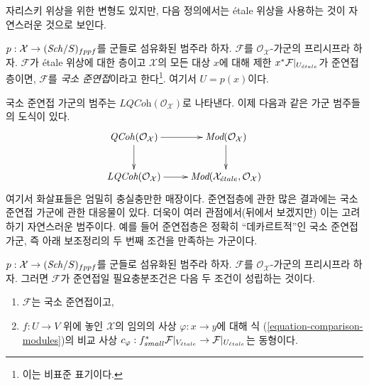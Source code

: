 \noindent
자리스키 위상을 위한 변형도 있지만, 다음 정의에서는
\'etale 위상을 사용하는 것이 자연스러운 것으로 보인다.

\begin{definition}
\label{definition-locally-quasi-coherent}
$p : \mathcal{X} \to (\mathit{Sch}/S)_{fppf}$를 군들로 섬유화된 범주라 하자.
$\mathcal{F}$를 $\mathcal{O}_\mathcal{X}$-가군의 프리시프라 하자.
$\mathcal{F}$가 \'etale 위상에 대한 층이고
$\mathcal{X}$의 모든 대상 $x$에 대해 제한
$x^*\mathcal{F}|_{U_{\acute{e}tale}}$가 준연접층이면,
$\mathcal{F}$를 {\it 국소 준연접}이라고 한다\footnote{이는
비표준 표기이다.}. 여기서 $U = p(x)$이다.
\end{definition}

\noindent
국소 준연접 가군의 범주는
$\textit{LQCoh}(\mathcal{O}_\mathcal{X})$로 나타낸다.
이제 다음과 같은 가군 범주들의 도식이 있다.
$$
\xymatrix{
\QCoh(\mathcal{O}_\mathcal{X}) \ar[r] \ar[d] &
\textit{Mod}(\mathcal{O}_\mathcal{X}) \ar[d] \\
\textit{LQCoh}(\mathcal{O}_\mathcal{X}) \ar[r] &
\textit{Mod}(\mathcal{X}_\etale, \mathcal{O}_\mathcal{X})
}
$$
여기서 화살표들은 엄밀히 충실충만한 매장이다.
준연접층에 관한 많은 결과에는 국소 준연접 가군에 관한 대응물이 있다.
더욱이 여러 관점에서(뒤에서 보겠지만) 이는 고려하기 자연스러운 범주이다.
예를 들어 준연접층은 정확히 ``데카르트적''인 국소 준연접 가군,
즉 아래 보조정리의 두 번째 조건을 만족하는 가군이다.

\begin{lemma}
\label{lemma-quasi-coherent}
$p : \mathcal{X} \to (\mathit{Sch}/S)_{fppf}$를 군들로 섬유화된 범주라 하자.
$\mathcal{F}$를 $\mathcal{O}_\mathcal{X}$-가군의 프리시프라 하자.
그러면 $\mathcal{F}$가 준연접일 필요충분조건은 다음 두 조건이
성립하는 것이다.
\begin{enumerate}
\item $\mathcal{F}$는 국소 준연접이고,
\item $f : U \to V$ 위에 놓인 $\mathcal{X}$의 임의의 사상
$\varphi : x \to y$에 대해 식
(\ref{equation-comparison-modules})의 비교 사상
$c_\varphi : f_{small}^*\mathcal{F}|_{V_{\acute{e}tale}} \to
\mathcal{F}|_{U_{\acute{e}tale}}$는 동형이다.
\end{enumerate}
\end{lemma}


